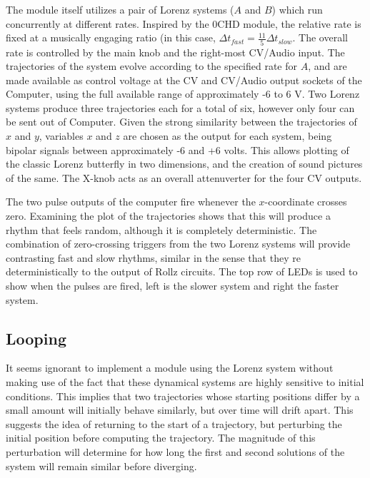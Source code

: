 \documentclass{tufte-handout}
\begin{document}
The module itself utilizes a pair of Lorenz systems ($A$ and $B$) which run concurrently at different rates. Inspired by the 0CHD module, the relative rate is fixed at a musically engaging ratio (in this case, $\Delta t_{fast} = \frac{11}{5} \Delta t_{slow}$. The overall rate is controlled by the main knob and the right-most CV/Audio input. The trajectories of the system evolve according to the specified rate for $A$, and are made available as control voltage at the CV and CV/Audio output sockets of the Computer, using the full available range of approximately -6 to 6 V. Two Lorenz systems produce three trajectories each for a total of six, however only four can be sent out of Computer. Given the strong similarity between the trajectories of $x$ and $y$, variables $x$ and $z$ are chosen as the output for each system, being bipolar signals between approximately -6 and +6 volts. This allows plotting of the classic Lorenz butterfly in two dimensions, and the creation of sound pictures of the same. The X-knob acts as an overall attenuverter for the four CV outputs.

The two pulse outputs of the computer fire whenever the $x$-coordinate crosses zero. Examining the plot of the trajectories shows that this will produce a rhythm that feels random, although it is completely deterministic. The combination of zero-crossing triggers from the two Lorenz systems will provide contrasting fast and slow rhythms, similar in the sense that they re deterministically  to the output of Rollz circuits. The top row of LEDs is used to show when the pulses are fired, left is the slower system and right the faster system.

\subsection{Looping}\label{sec:looping}

It seems ignorant to implement a module using the Lorenz system without making use of the fact that these dynamical systems are highly sensitive to initial conditions. This implies that two trajectories whose starting positions differ by a small amount will initially behave similarly, but over time will drift apart.
This suggests the idea of returning to the start of a trajectory, but perturbing the initial position before computing the trajectory. The magnitude of this perturbation will determine for how long the first and second solutions of the system will remain similar before diverging.
\end{document}
